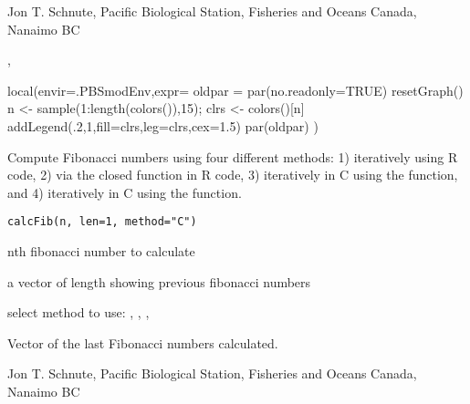 \documentclass[letterpaper]{book}
\begin{document}
%
\begin{Author}\relax
Jon T. Schnute, Pacific Biological Station, Fisheries and Oceans Canada, Nanaimo BC
\end{Author}
%
\begin{SeeAlso}\relax
{}, 
\end{SeeAlso}
%
\begin{Examples}
\begin{ExampleCode}
local(envir=.PBSmodEnv,expr={
  oldpar = par(no.readonly=TRUE)
  resetGraph()
  n <- sample(1:length(colors()),15); clrs <- colors()[n]
  addLegend(.2,1,fill=clrs,leg=clrs,cex=1.5)
  par(oldpar)
})
\end{ExampleCode}
\end{Examples}
%
\begin{Description}\relax
Compute Fibonacci numbers using four different methods:
1) iteratively using R code,
2) via the closed function in R code,
3) iteratively in C using the  function,
and 4) iteratively in C using the  function.
\end{Description}
%
\begin{Usage}
\begin{verbatim}
calcFib(n, len=1, method="C")
\end{verbatim}
\end{Usage}
%
\begin{Arguments}
\begin{ldescription}
\item[\code{n}]  nth fibonacci number to calculate
\item[\code{len}]  a vector of length  showing previous fibonacci numbers
\item[\code{method}]  select method to use: , , , 
\end{ldescription}
\end{Arguments}
%
\begin{Value}
Vector of the last  Fibonacci numbers 
calculated.
\end{Value}
%
\begin{Author}\relax
Jon T. Schnute, Pacific Biological Station, Fisheries and Oceans Canada, Nanaimo BC
\end{Author}
\end{document}
